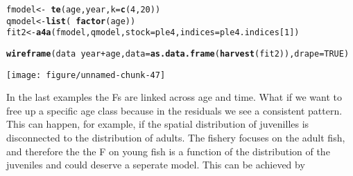 \documentclass[a4paper,english,10pt]{article}\usepackage[]{graphicx}\usepackage[]{color}
\makeatletter
\def\maxwidth{ %
  \ifdim\Gin@nat@width>\linewidth
    \linewidth
  \else
    \Gin@nat@width
  \fi
}
\newcommand{\hlnum}[1]{\textcolor[rgb]{0.686,0.059,0.569}{#1}}%
\newcommand{\hlopt}[1]{\textcolor[rgb]{0,0,0}{#1}}%
\newcommand{\hlstd}[1]{\textcolor[rgb]{0.345,0.345,0.345}{#1}}%
\newcommand{\hlkwb}[1]{\textcolor[rgb]{0.69,0.353,0.396}{#1}}%
\newcommand{\hlkwc}[1]{\textcolor[rgb]{0.333,0.667,0.333}{#1}}%
\newcommand{\hlkwd}[1]{\textcolor[rgb]{0.737,0.353,0.396}{\textbf{#1}}}%
\newenvironment{kframe}{%
 \def\at@end@of@kframe{}%
 \ifinner\ifhmode%
  \def\at@end@of@kframe{\end{minipage}}%
  \begin{minipage}{\columnwidth}%
 \fi\fi%
 \def\FrameCommand##1{\hskip\@totalleftmargin \hskip-\fboxsep
 \colorbox{shadecolor}{##1}\hskip-\fboxsep
     \hskip-\linewidth \hskip-\@totalleftmargin \hskip\columnwidth}%
 \MakeFramed {\advance\hsize-\width
   \@totalleftmargin\z@ \linewidth\hsize
   \@setminipage}}%
 {\par\unskip\endMakeFramed%
 \at@end@of@kframe}
\newenvironment{knitrout}{}{} %
\makeatother
\begin{document}
\begin{knitrout}
\color{fgcolor}\begin{kframe}
\begin{alltt}
\hlstd{fmodel} \hlkwb{<-} \hlopt{~}\hlkwd{te}\hlstd{(age, year,} \hlkwc{k} \hlstd{=} \hlkwd{c}\hlstd{(}\hlnum{4}\hlstd{,} \hlnum{20}\hlstd{))}
\hlstd{qmodel} \hlkwb{<-} \hlkwd{list}\hlstd{(}\hlopt{~}\hlkwd{factor}\hlstd{(age))}
\hlstd{fit2} \hlkwb{<-} \hlkwd{a4a}\hlstd{(fmodel, qmodel,} \hlkwc{stock} \hlstd{= ple4,} \hlkwc{indices} \hlstd{= ple4.indices[}\hlnum{1}\hlstd{])}
\end{alltt}


{\ttfamily\noindent\itshape\color{messagecolor}{\#\# Note: The following observations are treated as being missing at random:\\\#\# 	\ \ \ \ fleet year age\\\#\# 	 BTS-Isis 1997\ \  1\\\#\# 	 BTS-Isis 1997\ \  2\\\#\#\ \ \ \ \ \  Predictions will be made for missing observations.}}\begin{alltt}
\hlkwd{wireframe}\hlstd{(data} \hlopt{~} \hlstd{year} \hlopt{+} \hlstd{age,} \hlkwc{data} \hlstd{=} \hlkwd{as.data.frame}\hlstd{(}\hlkwd{harvest}\hlstd{(fit2)),} \hlkwc{drape} \hlstd{=} \hlnum{TRUE}\hlstd{)}
\end{alltt}
\end{kframe}
\texttt{[image: figure/unnamed-chunk-47]} 

\end{knitrout}


In the last examples the Fs are linked across age and time.  What if we want to free up a specific age class because in the residuals we see a consistent pattern.  This can happen, for example, if the spatial distribution of juvenilles is disconnected to the distribution of adults.  The fishery focuses on the adult fish, and therefore the the F on young fish is a function of the distribution of the juveniles and could deserve a seperate model.  This can be achieved by
\end{document}
